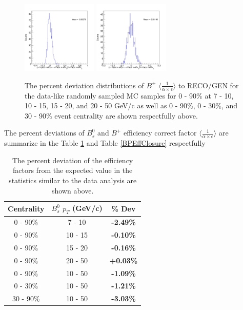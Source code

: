 \begin{figure}[h]
\begin{center}
\includegraphics[width= 0.32\textwidth]{Figures/Chapter5/BPEffONLY_30_90_-1.png}
\includegraphics[width= 0.32\textwidth]{Figures/Chapter5/BPEffONLY_0_90_-1.png} 
\caption{The percent deviation distributions of $B^+$ $\langle \frac{1}{\alpha \times \epsilon}\rangle$ to RECO/GEN for the data-like randomly sampled MC samples for 0 - 90\% at 7 - 10, 10 - 15, 15 - 20, and 20 - 50 GeV/c as well as 0 - 90\%, 0 - 30\%, and 30 - 90\% event centrality are shown respectfully above.} 
\label{BPLowStatFig} 
\end{center}
\end{figure}



The percent deviations of $B^0_s$ and $B^+$ efficiency correct factor $\langle \frac{1}{\alpha \times \epsilon}\rangle$ are summarize in the Table \ref{BsEffClosure} and Table \ref{BPEffClosure} respectfully


\begin{table}[h]
\begin{center}
\caption{The percent deviation of the efficiency factors from the expected value in the statistics similar to the data analysis are shown above.}
\vspace{1em}
\label{BsEffClosure}
  \begin{tabular}{| c | c |c |}
    \hline
     Centrality &   $B^0_s$  $p_T$ (GeV/c) &   \% Dev \\
    \hline
    \hline
0 - 90\% & 7 - 10 &  \textbf{-2.49\% }   \\ 
0 - 90\% & 10 - 15 &  \textbf{-0.10\% }   \\ 
0 - 90\% & 15 - 20 &   \textbf{-0.16\% }   \\ 
0 - 90\% & 20 - 50 &  \textbf{+0.03\% }   \\ 
0 - 90\% & 10 - 50 &  \textbf{-1.09\% }   \\ 
0 - 30\% & 10 - 50 &   \textbf{-1.21\% }   \\ 
30 - 90\% & 10 - 50 & \textbf{-3.03\% }   \\ 
    \hline
    \hline
\end{tabular}
\end{center}
\end{table}

